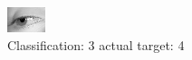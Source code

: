 \begin{figure}[h!]
\begin{center}
\includegraphics[width=0.60\columnwidth]{figures/ID3023_class_3_target_4.png}
\end{center}
\caption{ Classification: 3 actual target: 4}
\label{fig:ID3023_class_3_target_4}
\end{figure}

